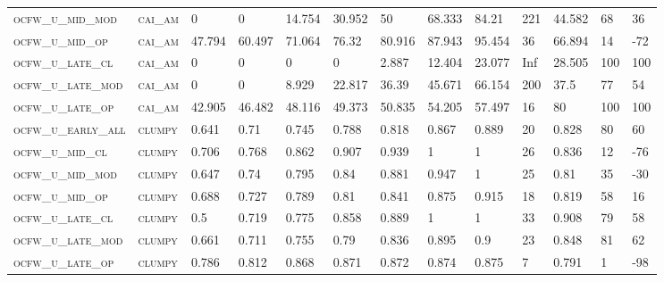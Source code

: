 \begin{landscape}
\begin{center}
\begin{footnotesize}
\begin{longtable}{lllllllllllll}
\textsc{ocfw\_u\_mid\_mod  } & \textsc{cai\_am   }   & 0        & 0        & 14.754   & 30.952   & 50       & 68.333   & 84.21     & 221    & 44.582        & 68            & 36       \\
\textsc{ocfw\_u\_mid\_op   } & \textsc{cai\_am   }   & 47.794   & 60.497   & 71.064   & 76.32    & 80.916   & 87.943   & 95.454    & 36     & 66.894        & 14            & -72      \\
\textsc{ocfw\_u\_late\_cl  } & \textsc{cai\_am   }   & 0        & 0        & 0        & 0        & 2.887    & 12.404   & 23.077    & Inf    & 28.505        & 100           & 100      \\
\textsc{ocfw\_u\_late\_mod } & \textsc{cai\_am   }   & 0        & 0        & 8.929    & 22.817   & 36.39    & 45.671   & 66.154    & 200    & 37.5          & 77            & 54       \\
\textsc{ocfw\_u\_late\_op  } & \textsc{cai\_am   }   & 42.905   & 46.482   & 48.116   & 49.373   & 50.835   & 54.205   & 57.497    & 16     & 80            & 100           & 100      \\
\textsc{ocfw\_u\_early\_all} & \textsc{clumpy    }   & 0.641    & 0.71     & 0.745    & 0.788    & 0.818    & 0.867    & 0.889     & 20     & 0.828         & 80            & 60       \\
\textsc{ocfw\_u\_mid\_cl   } & \textsc{clumpy    }   & 0.706    & 0.768    & 0.862    & 0.907    & 0.939    & 1        & 1         & 26     & 0.836         & 12            & -76      \\
\textsc{ocfw\_u\_mid\_mod  } & \textsc{clumpy    }   & 0.647    & 0.74     & 0.795    & 0.84     & 0.881    & 0.947    & 1         & 25     & 0.81          & 35            & -30      \\
\textsc{ocfw\_u\_mid\_op   } & \textsc{clumpy    }   & 0.688    & 0.727    & 0.789    & 0.81     & 0.841    & 0.875    & 0.915     & 18     & 0.819         & 58            & 16       \\
\textsc{ocfw\_u\_late\_cl  } & \textsc{clumpy    }   & 0.5      & 0.719    & 0.775    & 0.858    & 0.889    & 1        & 1         & 33     & 0.908         & 79            & 58       \\
\textsc{ocfw\_u\_late\_mod } & \textsc{clumpy    }   & 0.661    & 0.711    & 0.755    & 0.79     & 0.836    & 0.895    & 0.9       & 23     & 0.848         & 81            & 62       \\
\textsc{ocfw\_u\_late\_op  } & \textsc{clumpy    }   & 0.786    & 0.812    & 0.868    & 0.871    & 0.872    & 0.874    & 0.875     & 7      & 0.791         & 1             & -98      \\

\end{longtable}
\end{footnotesize}
\end{center}
\end{landscape}
